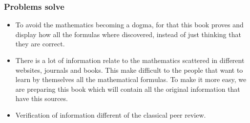 \documentclass{book}
\begin{document}
                \subsubsection{Problems solve}
                    \begin{itemize}
                        \item To avoid the mathematics becoming a dogma, for that this book proves and display how all the formulas where discovered, instead of just thinking that they are correct.

                        \item There is a lot of information relate to the mathematics scattered in different websites, journals and books. This make difficult to the people that want to learn by themselves all the mathematical formulas. To make it more easy, we are preparing this book which will contain all the original information that have this sources.

                        \item Verification of information different of the classical peer review.
                    \end{itemize}
    
\end{document}
